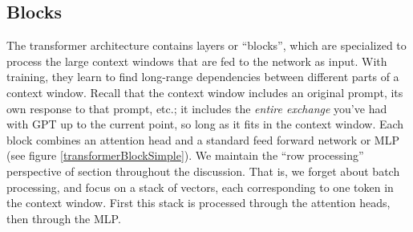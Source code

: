 \subsection{Blocks}

The transformer architecture \cite{vaswani2017attention} contains layers or
``blocks'', which are specialized to process the large context windows that are
fed to the network as input. With training, they learn to find long-range
dependencies between different parts of a context window. Recall that the
context window  includes an original prompt, its own response to that prompt,
etc.; it includes the \emph{entire exchange} you've had with GPT up to the
current point, so long as it fits in the context window. Each block combines an
attention head and a standard feed forward network or MLP (see figure
\ref{transformerBlockSimple}). We maintain the ``row processing'' perspective
of section  throughout the discussion. That is, we
forget about batch processing, and focus on a stack of vectors, each
corresponding to one token in the context window. First this stack is processed
through the attention heads, then through the MLP.  

